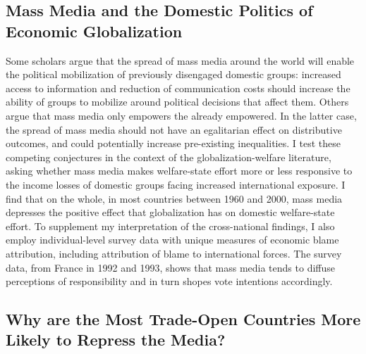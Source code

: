 \documentclass[12pt]{report}
\begin{document}
\subsection{Mass Media and the Domestic Politics of Economic Globalization}

Some scholars argue that the spread of mass media around the world
will enable the political mobilization of previously disengaged domestic
groups: increased access to information and reduction of communication
costs should increase the ability of groups to mobilize around political
decisions that affect them. Others argue that mass media only empowers
the already empowered. In the latter case, the spread of mass media
should not have an egalitarian effect on distributive outcomes, and
could potentially increase pre-existing inequalities. I test these
competing conjectures in the context of the globalization-welfare
literature, asking whether mass media makes welfare-state effort more
or less responsive to the income losses of domestic groups facing
increased international exposure. I find that on the whole, in most
countries between 1960 and 2000, mass media depresses the positive
effect that globalization has on domestic welfare-state effort. To
supplement my interpretation of the cross-national findings, I also
employ individual-level survey data with unique measures of economic
blame attribution, including attribution of blame to international
forces. The survey data, from France in 1992 and 1993, shows that
mass media tends to diffuse perceptions of responsibility and in turn
shopes vote intentions accordingly.


\subsection{Why are the Most Trade-Open Countries More Likely to Repress the
Media?}
\end{document}
